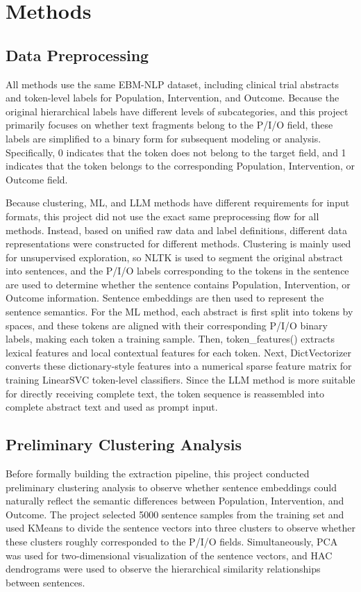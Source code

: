 \documentclass{article}
\begin{document}
\section{Methods}

\subsection{Data Preprocessing}
All methods use the same EBM-NLP dataset, including clinical trial abstracts and token-level labels for Population, Intervention, and Outcome. Because the original hierarchical labels have different levels of subcategories, and this project primarily focuses on whether text fragments belong to the P/I/O field, these labels are simplified to a binary form for subsequent modeling or analysis. Specifically, 0 indicates that the token does not belong to the target field, and 1 indicates that the token belongs to the corresponding Population, Intervention, or Outcome field.


Because clustering, ML, and LLM methods have different requirements for input formats, this project did not use the exact same preprocessing flow for all methods. Instead, based on unified raw data and label definitions, different data representations were constructed for different methods. Clustering is mainly used for unsupervised exploration, so NLTK is used to segment the original abstract into sentences, and the P/I/O labels corresponding to the tokens in the sentence are used to determine whether the sentence contains Population, Intervention, or Outcome information. Sentence embeddings are then used to represent the sentence semantics. For the ML method, each abstract is first split into tokens by spaces, and these tokens are aligned with their corresponding P/I/O binary labels, making each token a training sample. Then, token\_features() extracts lexical features and local contextual features for each token. Next, DictVectorizer converts these dictionary-style features into a numerical sparse feature matrix for training LinearSVC token-level classifiers. Since the LLM method is more suitable for directly receiving complete text, the token sequence is reassembled into complete abstract text and used as prompt input.

\subsection{Preliminary Clustering Analysis}
Before formally building the extraction pipeline, this project conducted preliminary clustering analysis to observe whether sentence embeddings could naturally reflect the semantic differences between Population, Intervention, and Outcome. The project selected 5000 sentence samples from the training set and used KMeans to divide the sentence vectors into three clusters to observe whether these clusters roughly corresponded to the P/I/O fields. Simultaneously, PCA was used for two-dimensional visualization of the sentence vectors, and HAC dendrograms were used to observe the hierarchical similarity relationships between sentences.
\end{document}
